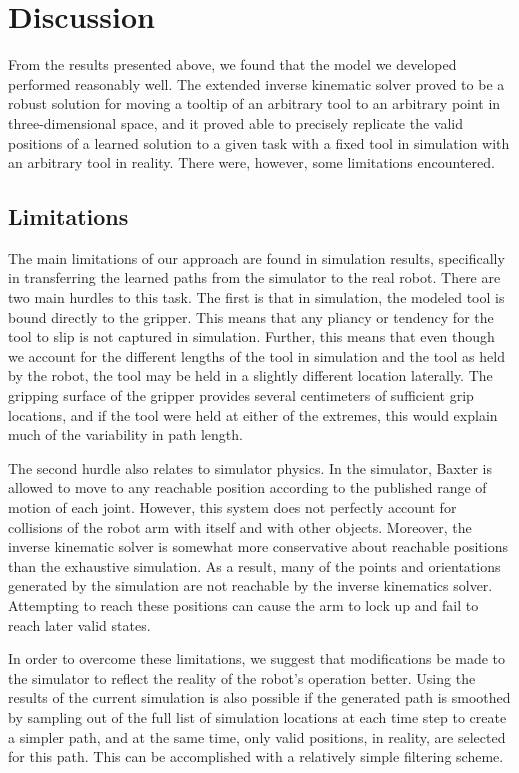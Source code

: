 \documentclass[conference]{IEEEtran}
\begin{document}
\section{Discussion}
From the results presented above, we found that the model we developed performed reasonably well. The extended inverse kinematic solver proved to be a robust solution for moving a tooltip of an arbitrary tool to an arbitrary point in three-dimensional space, and it proved able to precisely replicate the valid positions of a learned solution to a given task with a fixed tool in simulation with an arbitrary tool in reality.  There were, however, some limitations encountered.  

\subsection{Limitations}
The main limitations of our approach are found in simulation results, specifically in transferring the learned paths from the simulator to the real robot. There are two main hurdles to this task. The first is that in simulation, the modeled tool is bound directly to the gripper. This means that any pliancy or tendency for the tool to slip is not captured in simulation. Further, this means that even though we account for the different lengths of the tool in simulation and the tool as held by the robot, the tool may be held in a slightly different location laterally. The gripping surface of the gripper provides several centimeters of sufficient grip locations, and if the tool were held at either of the extremes, this would explain much of the variability in path length. 

The second hurdle also relates to simulator physics. In the simulator, Baxter is allowed to move to any reachable position according to the published range of motion of each joint. However, this system does not perfectly account for collisions of the robot arm with itself and with other objects. Moreover, the inverse kinematic solver is somewhat more conservative about reachable positions than the exhaustive simulation. As a result, many of the points and orientations generated by the simulation are not reachable by the inverse kinematics solver. Attempting to reach these positions can cause the arm to lock up and fail to reach later valid states. 

In order to overcome these limitations, we suggest that modifications be made to the simulator to reflect the reality of the robot's operation better. Using the results of the current simulation is also possible if the generated path is smoothed by sampling out of the full list of simulation locations at each time step to create a simpler path, and at the same time, only valid positions, in reality, are selected for this path. This can be accomplished with a relatively simple filtering scheme. 
\end{document}
